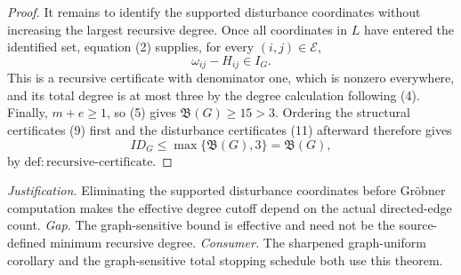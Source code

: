 \documentclass{article}
\begin{document}
\begin{proof}
It remains to identify the supported disturbance coordinates without increasing the largest recursive degree.  Once all coordinates in \(L\) have entered the identified set, equation (2) supplies, for every \((i,j)\in\mathcal E\),
\[
 \omega_{ij}-H_{ij}\in I_G.
 \tag{11}
\]
This is a recursive certificate with denominator one, which is nonzero everywhere, and its total degree is at most three by the degree calculation following (4).  Finally, \(m+e\geq1\), so (5) gives \(\mathfrak B(G)\geq15>3\).  Ordering the structural certificates (9) first and the disturbance certificates (11) afterward therefore gives
\[
 ID_G\leq\max\{\mathfrak B(G),3\}=\mathfrak B(G),
\]
by \(\mathrm{def:recursive\mbox{-}certificate}\).
\end{proof}
\par\smallskip\noindent \textit{Justification.} Eliminating the supported disturbance coordinates before Gröbner computation makes the effective degree cutoff depend on the actual directed-edge count. \textit{Gap.} The graph-sensitive bound is effective and need not be the source-defined minimum recursive degree. \textit{Consumer.} The sharpened graph-uniform corollary and the graph-sensitive total stopping schedule both use this theorem.
\end{document}
